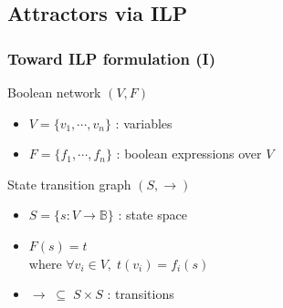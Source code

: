 \documentclass{beamer}
\begin{document}
\subsection{Attractors via ILP}

\begin{frame}
  \frametitle{Toward ILP formulation (I)}
  \begin{block}{Boolean network $ (V, F) $}
    \begin{itemize}
      \item $ V = \{ v_1, \cdots, v_n \} $ : variables
      \item $ F = \{ f_1, \cdots, f_n \} $ : boolean expressions over $ V $
    \end{itemize}
  \end{block}
  \pause
  \begin{block}{State transition graph $ (S, \rightarrow) $}
    \begin{overlayarea}{6cm}{4cm}
      \begin{itemize}
      \item $ S = \{ s : V \longrightarrow \mathbb{B} \} $ : state space
      \item $ F(s) = t $ \\
        where $ \forall v_i \in V, \; t(v_i) = f_i(s) $
      \item $ \rightarrow \; \subseteq \; S \times S $ : transitions
        \pause
        \begin{itemize}
          \setlength{\abovedisplayskip}{-11pt}
          \setlength{\belowdisplayskip}{0pt}
          \setlength{\abovedisplayshortskip}{0pt}
          \setlength{\belowdisplayshortskip}{0pt}
        \end{itemize}
      \end{itemize}
    \end{overlayarea}
  \end{block}
\end{frame}
\end{document}
